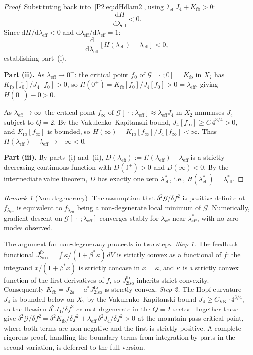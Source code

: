 \documentclass[11pt,a4paper]{article}
\newcommand{\ms}{\mu^{*}}
\newcommand{\leff}{\lambda_{\mathrm{eff}}}
\newcommand{\bst}{\beta^{*}}
\newcommand{\Kfb}{K_{\mathrm{fb}}}
\newcommand{\Jfb}{J_{2\mathrm{iso}}^{\mathrm{fb}}}
\newcommand{\Ja}{J_{2a}}
\newcommand{\Jfour}{J_{4}}
\newcommand{\kk}{\kappa}
\newcommand{\G}{\mathcal{G}}
\theoremstyle{remark}
\newtheorem{remark}[theorem]{Remark}
\begin{document}
\begin{proof}
Substituting back into~\eqref{P2:eq:dHdlam2}, using
$\leff\Jfour + \Kfb > 0$:
\begin{equation}
  \frac{\mathrm{d}H}{\mathrm{d}\leff} < 0.
  \label{P2:eq:Hdecreasing}
\end{equation}
Since $\mathrm{d}H/\mathrm{d}\leff < 0$ and $\mathrm{d}\leff/\mathrm{d}\leff = 1$:
\begin{equation}
  \frac{\mathrm{d}}{\mathrm{d}\leff}[H(\leff) - \leff] < 0,
\end{equation}
establishing part~(i).

\textbf{Part (ii).}
As $\leff\to 0^+$: the critical point $f_0$ of $\G[\,\cdot\,;0]=\Kfb$
in $X_2$ has $\Kfb[f_0]/\Jfour[f_0] > 0$, so
$H(0^+)=\Kfb[f_0]/\Jfour[f_0] > 0 = \leff$, giving $H(0^+)-0 > 0$.

As $\leff\to\infty$: the critical point $f_\infty$ of
$\G[\,\cdot\,;\leff]\approx \leff\Jfour$ in $X_2$ minimises $\Jfour$
subject to $Q=2$.  By the Vakulenko--Kapitanski bound,
$\Jfour[f_\infty]\geq C\,4^{3/4}>0$, and $\Kfb[f_\infty]$ is bounded,
so $H(\infty) = \Kfb[f_\infty]/\Jfour[f_\infty] < \infty$.
Thus $H(\leff)-\leff\to -\infty < 0$.

\textbf{Part (iii).}
By parts~(i) and~(ii), $D(\leff):=H(\leff)-\leff$ is a strictly
decreasing continuous function with $D(0^+)>0$ and $D(\infty)<0$.
By the intermediate value theorem, $D$ has exactly one zero
$\leff^*$, i.e., $H(\leff^*)=\leff^*$.
\end{proof}

\begin{remark}[Non-degeneracy]
\label{P2:rem:nd}
The assumption that $\delta^2\G/\delta f^2$ is positive definite at
$f_{\leff}$ is equivalent to $f_{\leff}$ being a non-degenerate
local minimum of $\G$.
Numerically, gradient descent on $\G[\,\cdot\,;\leff]$ converges
stably for $\leff$ near $\leff^*$, with no zero modes observed.

The argument for non-degeneracy proceeds in two steps.
\emph{Step 1.}  The feedback functional
$\Jfb = \int \kk/(1+\bst\kk)\,dV$ is strictly convex as a functional
of $f$: the integrand $x/(1+\bst x)$ is strictly concave in $x=\kk$,
and $\kk$ is a strictly convex function of the first derivatives of $f$,
so $\Jfb$ inherits strict convexity.
Consequently $\Kfb = \Ja + \ms\Jfb$ is strictly convex.
\emph{Step 2.}  The Hopf curvature $\Jfour$ is bounded below on $X_2$
by the Vakulenko--Kapitanski bound $\Jfour \geq C_{\mathrm{VK}}\cdot4^{3/4}$,
so the Hessian $\delta^2\Jfour/\delta f^2$ cannot degenerate
in the $Q=2$ sector.
Together these give $\delta^2\G/\delta f^2 = \delta^2\Kfb/\delta f^2
+ \leff\,\delta^2\Jfour/\delta f^2 > 0$
at the mountain-pass critical point, where both terms are non-negative
and the first is strictly positive.
A complete rigorous proof, handling the boundary terms from integration
by parts in the second variation, is deferred to the full version.
\end{remark}
\end{document}
